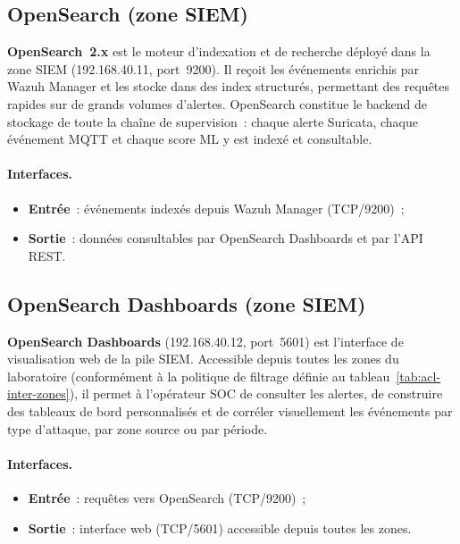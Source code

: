 \subsection{OpenSearch (zone SIEM)}
\label{subsec:env-opensearch}

\textbf{OpenSearch~2.x} est le moteur d'indexation et de recherche déployé dans la zone SIEM (192.168.40.11, port~9200). Il reçoit les événements enrichis par Wazuh Manager et les stocke dans des index structurés, permettant des requêtes rapides sur de grands volumes d'alertes. OpenSearch constitue le backend de stockage de toute la chaîne de supervision~: chaque alerte Suricata, chaque événement MQTT et chaque score ML y est indexé et consultable.

\paragraph{Interfaces.}
\begin{itemize}[leftmargin=*]
  \item \textbf{Entrée}~: événements indexés depuis Wazuh Manager (TCP/9200)~;
  \item \textbf{Sortie}~: données consultables par OpenSearch Dashboards et par l'API REST.
\end{itemize}

\subsection{OpenSearch Dashboards (zone SIEM)}
\label{subsec:env-dashboards}

\textbf{OpenSearch Dashboards} (192.168.40.12, port~5601) est l'interface de visualisation web de la pile SIEM. Accessible depuis toutes les zones du laboratoire (conformément à la politique de filtrage définie au tableau~\ref{tab:acl-inter-zones}), il permet à l'opérateur SOC de consulter les alertes, de construire des tableaux de bord personnalisés et de corréler visuellement les événements par type d'attaque, par zone source ou par période.

\paragraph{Interfaces.}
\begin{itemize}[leftmargin=*]
  \item \textbf{Entrée}~: requêtes vers OpenSearch (TCP/9200)~;
  \item \textbf{Sortie}~: interface web (TCP/5601) accessible depuis toutes les zones.
\end{itemize}

